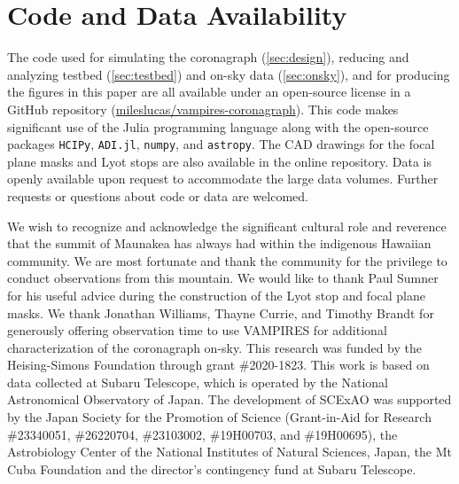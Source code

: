 \documentclass[]{spie}  %
\begin{document}

\appendix    %


\section{Code and Data Availability}\label{sec:code}

The code used for simulating the coronagraph (\autoref{sec:design}), reducing and analyzing testbed (\autoref{sec:testbed}) and on-sky data (\autoref{sec:onsky}), and for producing the figures in this paper are all available under an open-source license in a GitHub repository (\href{https://github.com/mileslucas/vampires-coronagraph}{mileslucas/vampires-coronagraph}). This code makes significant use of the Julia programming language\cite{bezanson2017} along with the open-source packages \texttt{HCIPy}\cite{por2018}, \texttt{ADI.jl}\cite{lucas2020}, \texttt{numpy}\cite{harris2020}, and \texttt{astropy}\cite{astropycollaboration2013,astropycollaboration2018}. The CAD drawings for the focal plane masks and Lyot stops are also available in the online repository. Data is openly available upon request to accommodate the large data volumes. Further requests or questions about code or data are welcomed.

\acknowledgments

We wish to recognize and acknowledge the significant cultural role and reverence that the summit of Maunakea has always had within the indigenous Hawaiian community. We are most fortunate and thank the community for the privilege to conduct observations from this mountain. We would like to thank Paul Sumner for his useful advice during the construction of the Lyot stop and focal plane masks. We thank Jonathan Williams, Thayne Currie, and Timothy Brandt for generously offering observation time to use VAMPIRES for additional characterization of the coronagraph on-sky. This research was funded by the Heising-Simons Foundation through grant \#2020-1823. This work is based on data collected at Subaru Telescope, which is operated by the National Astronomical Observatory of Japan. The development of SCExAO was supported by the Japan Society for the Promotion of Science (Grant-in-Aid for Research \#23340051, \#26220704, \#23103002, \#19H00703, and \#19H00695), the Astrobiology Center of the National Institutes of Natural Sciences, Japan, the Mt Cuba Foundation and the director's contingency fund at Subaru Telescope. 


\end{document}
